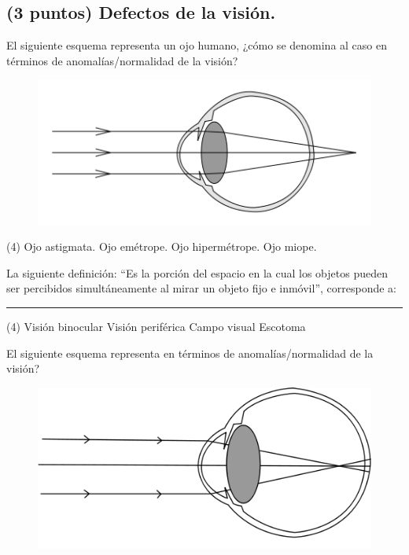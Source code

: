 \documentclass[12pt]{exam}
\begin{document}
\begin{questions}

    \section{(3 puntos) Defectos de la visión.}
    
    \question El siguiente esquema representa un ojo humano, ¿cómo se denomina al caso en términos de anomalías/normalidad de la visión?
    \begin{figure}[H]
        \centering
        \includegraphics[scale=0.5]{Imagenes/Defectos_Vision_05.png}
    \end{figure}
    \begin{tasks}(4)
        \task Ojo astigmata.
        \task Ojo emétrope.
        \task Ojo hipermétrope.
        \task Ojo miope.
    \end{tasks}
    \question La siguiente definición: \enquote{Es la porción del espacio en la cual los objetos pueden ser percibidos simultáneamente al mirar un objeto fijo e inmóvil}, corresponde a: \rule{2cm}{0.1mm}
    \begin{tasks}(4)
        \task Visión binocular
        \task Visión periférica
        \task Campo visual
        \task Escotoma
    \end{tasks}
    \question El siguiente esquema representa en términos de anomalías/normalidad de la visión?
    \begin{figure}[H]
        \centering
        \includegraphics[scale=0.35]{Imagenes/Defectos_Vision_03.png}

\end{figure}
\end{questions}
\end{document}
